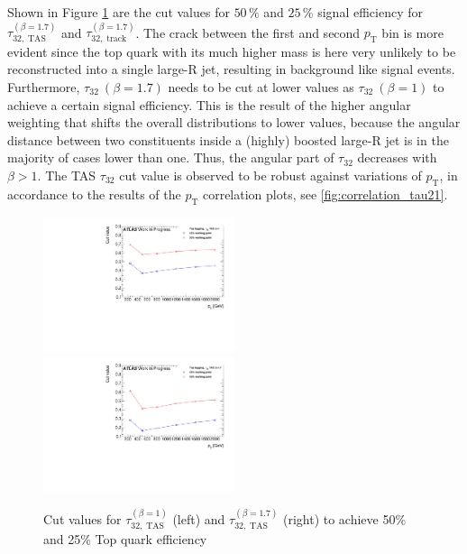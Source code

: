 Shown in Figure \ref{fig:top_cut} are the cut values for $50\,\%$ and $25\,\%$ signal efficiency for $\tau_{32,\;\text{TAS}}^{(\beta=1.7)}$ and $\tau_{32,\;\text{track}}^{(\beta=1.7)}$. The crack between the first and second $p_{\mathrm{T}}$ bin is more evident since the top quark with its much higher mass is here very unlikely to be reconstructed into a single large-R jet, resulting in background like signal events. Furthermore, $\tau_{32} \: (\beta=1.7)$ needs to be cut at lower values as $\tau_{32}\: (\beta=1)$ to achieve a certain signal efficiency. This is the result of the higher angular weighting that shifts the overall distributions to lower values, because the angular distance between two constituents inside a (highly) boosted large-R jet is in the majority of cases lower than one. Thus, the angular part of $\tau_{32}$ decreases with $\beta > 1$. The TAS $\tau_{32}$ cut value is observed to be robust against variations of $p_{\mathrm{T}}$, in accordance to the results of the $p_{\mathrm{T}}$ correlation plots, see \ref{fig:correlation_tau21}.
\begin{figure}[htp]
\includegraphics[width=0.5\textwidth]{sascha_input/plots/Top/cut_values/tau32_tas1.pdf} \hspace{1mm}
\includegraphics[width=0.5\textwidth]{sascha_input/plots/Top/cut_values/tau32_tas17.pdf}
\caption{\footnotesize{Cut values for $\tau_{32,\;\text{TAS}}^{(\beta=1)}$ (left) and $\tau_{32,\;\text{TAS}}^{(\beta=1.7)}$ (right) to achieve 50\% and 25\% Top quark efficiency}}\label{fig:top_cut}
\end{figure}

